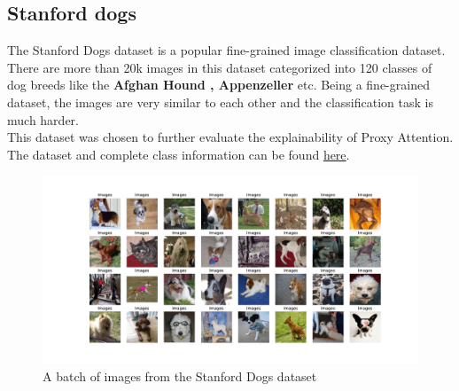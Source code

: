 \subsection{Stanford dogs}
The Stanford Dogs dataset \cite{khoslaNovelDatasetFineGrained} is a popular fine-grained image classification dataset. There are more than 20k images in this dataset categorized into  120 classes of dog breeds like the \textbf{Afghan Hound , Appenzeller} etc. Being a fine-grained dataset, the images are very similar to each other and the classification task is much harder.\\
This dataset was chosen to further evaluate the explainability of Proxy Attention.\\
The dataset and complete class information can be found \href{http://vision.stanford.edu/aditya86/ImageNetDogs/}{here}.
\begin{figure}[H]
    \centering
    \includegraphics[width=1\textwidth]{images/dogs.pdf}
    \caption{A batch of images from the Stanford Dogs dataset}
    \label{fig:dogs}
\end{figure}



